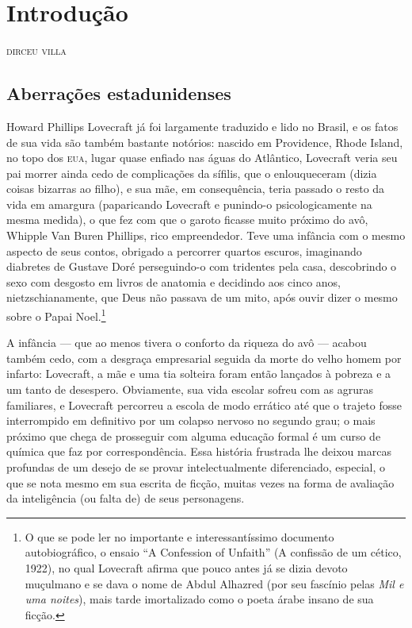 

\chapter[Introdução, \emph{por Dirceu Villa}]{Introdução\smallskip{}}

\begin{flushright}
\textsc{dirceu villa}
\end{flushright}

\section{Aberrações estadunidenses}

\noindent{}Howard Phillips Lovecraft já foi largamente traduzido e lido
no Brasil, e os fatos de sua vida são também bastante notórios: nascido
em Providence, Rhode Island, no topo dos \textsc{eua}, lugar quase enfiado nas
águas do Atlântico, Lovecraft veria seu pai morrer ainda cedo de
complicações da sífilis, que o enlouqueceram (dizia coisas bizarras ao
filho), e sua mãe, em consequência, teria passado o resto da vida em
amargura (paparicando Lovecraft e punindo-o psicologicamente
na mesma medida), o que fez com que o garoto ficasse muito próximo do
avô, Whipple Van Buren Phillips, rico empreendedor. Teve uma
infância com o mesmo aspecto de seus contos, obrigado a percorrer
quartos escuros, imaginando diabretes de Gustave Doré perseguindo-o com
tridentes pela casa, descobrindo o sexo com desgosto em livros de
anatomia e decidindo aos cinco anos, nietzschianamente, que Deus não
passava de um mito, após ouvir dizer o mesmo sobre o Papai
Noel.\footnote{O que se pode ler no importante e interessantíssimo
  documento autobiográfico, o ensaio ``A Confession of Unfaith'' (A confissão de um cético, 1922),
  no qual Lovecraft afirma que pouco antes já se dizia devoto
  muçulmano e se dava o nome de Abdul Alhazred (por seu fascínio pelas
  \emph{Mil e uma noites}), mais tarde imortalizado como o poeta
  árabe insano de sua ficção.}

A infância --- que ao menos tivera o conforto da riqueza do avô ---
acabou também cedo, com a desgraça empresarial seguida da morte do velho
homem por infarto: Lovecraft, a mãe e uma tia solteira foram então
lançados à pobreza e a um tanto de desespero. Obviamente, sua vida
escolar sofreu com as agruras familiares, e Lovecraft percorreu a escola
de modo errático até que o trajeto fosse interrompido em definitivo por
um colapso nervoso no segundo grau; o mais próximo que chega de
prosseguir com alguma educação formal é um curso de química que faz por
correspondência. Essa história frustrada lhe deixou marcas profundas de
um desejo de se provar intelectualmente diferenciado, especial, o que se
nota mesmo em sua escrita de ficção, muitas vezes na forma de avaliação
da inteligência (ou falta de) de seus personagens.

